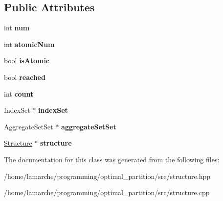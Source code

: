 \subsection*{Public Attributes}
\begin{DoxyCompactItemize}
\item 
\hypertarget{classAggregate_ac42c1b3d32c6e08ea61e48b3b6ac7ad0}{int {\bfseries num}}\label{classAggregate_ac42c1b3d32c6e08ea61e48b3b6ac7ad0}

\item 
\hypertarget{classAggregate_a552e19788377165eb2c1ed271f3f3a3e}{int {\bfseries atomic\-Num}}\label{classAggregate_a552e19788377165eb2c1ed271f3f3a3e}

\item 
\hypertarget{classAggregate_ae7c064692c4a8004a74bfebaccd01936}{bool {\bfseries is\-Atomic}}\label{classAggregate_ae7c064692c4a8004a74bfebaccd01936}

\item 
\hypertarget{classAggregate_aec4124ff46987d00192e8043962c8962}{bool {\bfseries reached}}\label{classAggregate_aec4124ff46987d00192e8043962c8962}

\item 
\hypertarget{classAggregate_a10047f4b30840600761d5383a6472af8}{int {\bfseries count}}\label{classAggregate_a10047f4b30840600761d5383a6472af8}

\item 
\hypertarget{classAggregate_a7a7f1ac4a5359b14f8fe8b4c66928ec7}{Index\-Set $\ast$ {\bfseries index\-Set}}\label{classAggregate_a7a7f1ac4a5359b14f8fe8b4c66928ec7}

\item 
\hypertarget{classAggregate_a167a1b5708ed86332f95c3a7858c8fea}{Aggregate\-Set\-Set $\ast$ {\bfseries aggregate\-Set\-Set}}\label{classAggregate_a167a1b5708ed86332f95c3a7858c8fea}

\item 
\hypertarget{classAggregate_ace2405f837356a6984d3dc6a5d516df9}{\hyperlink{classStructure}{Structure} $\ast$ {\bfseries structure}}\label{classAggregate_ace2405f837356a6984d3dc6a5d516df9}

\end{DoxyCompactItemize}


The documentation for this class was generated from the following files\-:\begin{DoxyCompactItemize}
\item 
/home/lamarche/programming/optimal\-\_\-partition/src/structure.\-hpp\item 
/home/lamarche/programming/optimal\-\_\-partition/src/structure.\-cpp\end{DoxyCompactItemize}
